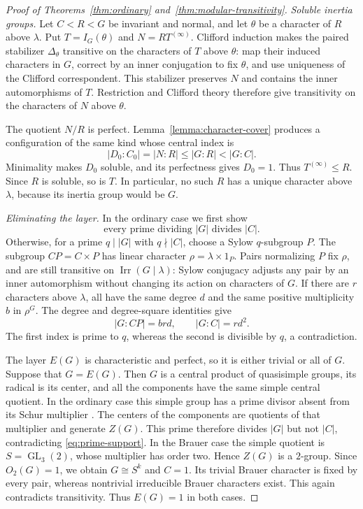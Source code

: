 \documentclass[11pt,a4paper]{amsart}
\DeclareMathOperator{\Irr}{Irr}
\DeclareMathOperator{\GL}{GL}
\theoremstyle{remark}
\numberwithin{equation}{section}
\begin{document}
\begin{proof}[Proof of Theorems~\ref{thm:ordinary}
and~\ref{thm:modular-transitivity}]
\smallskip\noindent\emph{Soluble inertia groups.}
Let $C<R<G$ be invariant and normal, and let $\theta$ be a character of
$R$ above $\lambda$. Put $T=I_G(\theta)$ and $N=RT^{(\infty)}$.
Clifford induction makes the paired stabilizer $\Delta_\theta$
transitive on the characters of $T$ above $\theta$: map their induced
characters in $G$, correct by an inner conjugation to fix $\theta$,
and use uniqueness of the Clifford correspondent. This stabilizer
preserves $N$ and contains the inner automorphisms of $T$. Restriction
and Clifford theory therefore give transitivity on the characters of
$N$ above $\theta$.

The quotient $N/R$ is perfect. Lemma~\ref{lemma:character-cover} produces
a configuration of the same kind whose central index is
\[
 |D_0:C_0|=|N:R|\leq |G:R|<|G:C|.
\]
Minimality makes $D_0$ soluble, and its perfectness gives $D_0=1$.
Thus $T^{(\infty)}\leq R$. Since $R$ is soluble, so is $T$.
In particular, no such $R$ has a unique character above $\lambda$,
because its inertia group would be $G$.

\smallskip\noindent\emph{Eliminating the layer.}
In the ordinary case we first show
\begin{equation}\label{eq:prime-support}
 \text{every prime dividing $|G|$ divides $|C|$.}
\end{equation}
Otherwise, for a prime $q\mid |G|$ with $q\nmid |C|$, choose a Sylow
$q$-subgroup $P$. The subgroup $CP=C\times P$ has linear character
$\rho=\lambda\times1_P$. Pairs normalizing $P$ fix $\rho$, and are
still transitive on $\Irr(G\mid\lambda)$: Sylow conjugacy adjusts any
pair by an inner automorphism without changing its action on characters
of $G$. If there are $r$ characters above $\lambda$, all have the same
degree $d$ and the same positive multiplicity $b$ in $\rho^G$.
The degree and degree-square identities give
\[
 |G:CP|=brd,\qquad |G:C|=rd^2.
\]
The first index is prime to $q$, whereas the second is divisible by $q$,
a contradiction.

The layer $E(G)$ is characteristic and perfect, so it is either trivial
or all of $G$. Suppose that $G=E(G)$. Then $G$ is a central product of
quasisimple groups, its radical is its center, and all the components
have the same simple central quotient.
In the ordinary case this simple group has a prime divisor absent from
its Schur multiplier \cite[Theorem~3.4]{NavarroRizo}. The centers of
the components are quotients of that multiplier and generate $Z(G)$.
This prime therefore divides $|G|$ but not $|C|$, contradicting
\eqref{eq:prime-support}.
In the Brauer case the simple quotient is $S=\GL_3(2)$, whose multiplier
has order two. Hence $Z(G)$ is a $2$-group. Since $O_2(G)=1$, we obtain
$G\cong S^k$ and $C=1$. Its trivial Brauer character is fixed by every
pair, whereas nontrivial irreducible Brauer characters exist. This again
contradicts transitivity. Thus $E(G)=1$ in both cases.


\end{proof}
\end{document}
